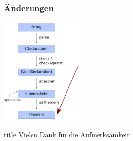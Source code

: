 \documentclass{beamer}
\begin{document}
\begin{frame}
\frametitle{Änderungen}
\includegraphics[height=200px]{overview-free-theorems-pfeil6}
\end{frame}

  \begin{frame}
  \vfill
  \centering
  \begin{beamercolorbox}[sep=8pt,center,shadow=true,rounded=true]{title}
    Vielen Dank für die Aufmerksamkeit\par%
  \end{beamercolorbox}
  \vfill
  \end{frame}
\end{document}
